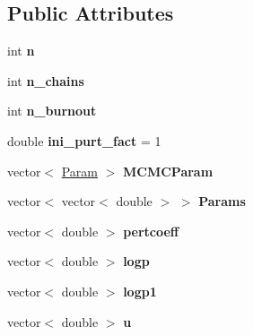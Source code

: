 \subsection*{Public Attributes}
\begin{DoxyCompactItemize}
\item 
\mbox{\label{class_c_m_c_m_c_a786d7105909887b0d160c62c0affe9dc}} 
int {\bfseries n}
\item 
\mbox{\label{class_c_m_c_m_c_afc30ea025c9b0e9a35aa9d89545144ed}} 
int {\bfseries n\+\_\+chains}
\item 
\mbox{\label{class_c_m_c_m_c_a492e4a401c4603a1dcbdff308aa2d6cf}} 
int {\bfseries n\+\_\+burnout}
\item 
\mbox{\label{class_c_m_c_m_c_ab58385ca6279fd50f0da629e14f17dd2}} 
double {\bfseries ini\+\_\+purt\+\_\+fact} = 1
\item 
\mbox{\label{class_c_m_c_m_c_a4d13caa2ecf37e80183d269b08521881}} 
vector$<$ \hyperlink{struct_param}{Param} $>$ {\bfseries M\+C\+M\+C\+Param}
\item 
\mbox{\label{class_c_m_c_m_c_a025e32b843b639c3d2ff6caf247b29c6}} 
vector$<$ vector$<$ double $>$ $>$ {\bfseries Params}
\item 
\mbox{\label{class_c_m_c_m_c_a988ac12e784cbba8d2d091d4a7686325}} 
vector$<$ double $>$ {\bfseries pertcoeff}
\item 
\mbox{\label{class_c_m_c_m_c_abf55271dbf74da6c880ec2bb28319fa7}} 
vector$<$ double $>$ {\bfseries logp}
\item 
\mbox{\label{class_c_m_c_m_c_a940ed04d7c5bbfbeba6a4bfd0db7c22c}} 
vector$<$ double $>$ {\bfseries logp1}
\item 
\mbox{\label{class_c_m_c_m_c_a73d53c8404648d54bedb64fedd18a297}} 
vector$<$ double $>$ {\bfseries u}
\item 
\mbox{\label{class_c_m_c_m_c_a2fbd8f417bafb4c7a3fb38bf215b1908}} 

\end{DoxyCompactItemize}
